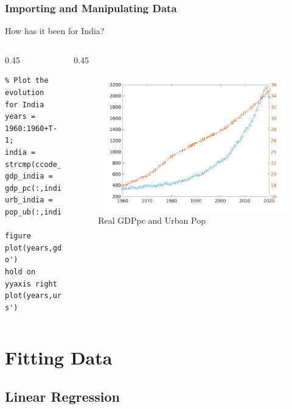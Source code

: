 \documentclass[11pt,xcolor={svgnames},aspectratio=169,usepdftitle=false]{beamer}
\begin{document}
\begin{frame}[fragile]
  \frametitle{Importing and Manipulating Data}
How has it been for India?

\begin{columns}
\begin{column}{0.45\textwidth}
\begin{lstlisting}
% Plot the evolution for India
years = 1960:1960+T-1;
india = strcmp(ccode_gdp,'IND');
gdp_india = gdp_pc(:,india);
urb_india = pop_ub(:,india);
  
figure
plot(years,gdp_india,'-o')
hold on
yyaxis right
plot(years,urb_india,'-s')
\end{lstlisting}
\end{column}
\begin{column}{0.45\textwidth}
\begin{figure}
  \centering
  \includegraphics[width = \textwidth]{../figures/india_gdp_urb.png}
  \caption{Real GDPpc and Urban Pop}
  \label{fig:india_evolution}
\end{figure}
\end{column}
\end{columns}
\end{frame}

\section{Fitting Data}

\subsection{Linear Regression}
\end{document}
